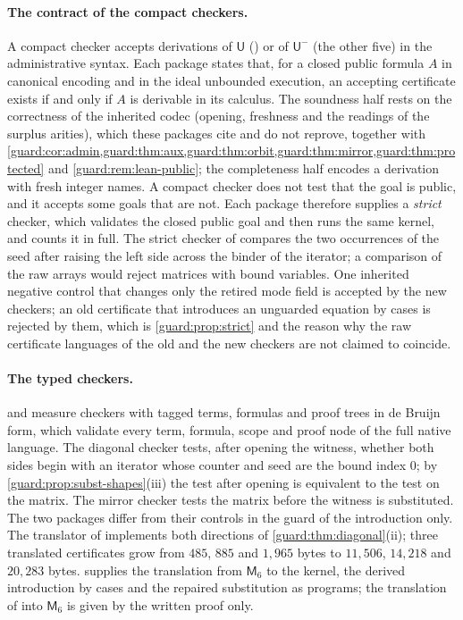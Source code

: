 \paragraph{The contract of the compact checkers.}
A compact checker accepts derivations of $\mathsf U$
() or of $\mathsf U^{-}$ (the other five) in the
administrative syntax.  Each package states that, for a closed public
formula $A$ in canonical encoding and in the ideal unbounded execution, an
accepting certificate exists if and only if $A$ is derivable in its
calculus.  The soundness half rests on the correctness of the inherited
codec (opening, freshness and the readings of the surplus arities), which
these packages cite and do not reprove, together with
\cref{guard:cor:admin,guard:thm:aux,guard:thm:orbit,guard:thm:mirror,guard:thm:protected}
and \cref{guard:rem:lean-public}; the completeness half encodes a
derivation with fresh integer names.  A compact checker does not test that
the goal is public, and it accepts some goals that are not.  Each package
therefore supplies a \emph{strict} checker, which validates the closed
public goal and then runs the same kernel, and counts it in full.  The
strict checker of  compares the two occurrences of the
seed after raising the left side across the binder of the iterator; a
comparison of the raw arrays would reject matrices with bound variables.
One inherited negative control that changes only the retired mode field is
accepted by the new checkers; an old certificate that introduces an
unguarded equation by cases is rejected by them, which is
\cref{guard:prop:strict} and the reason why the raw certificate languages
of the old and the new checkers are not claimed to coincide.

\paragraph{The typed checkers.}
 and  measure checkers with tagged
terms, formulas and proof trees in de Bruijn form, which validate every
term, formula, scope and proof node of the full native language.  The
diagonal checker tests, after opening the witness, whether both sides begin
with an iterator whose counter and seed are the bound index $0$; by
\cref{guard:prop:subst-shapes}(iii) the test after opening is equivalent to
the test on the matrix.  The mirror checker tests the matrix before the
witness is substituted.  The two packages differ from their controls in the
guard of the introduction only.  The translator of 
implements both directions of \cref{guard:thm:diagonal}(ii); three
translated certificates grow from $485$, $885$ and $1{,}965$ bytes to
$11{,}506$, $14{,}218$ and $20{,}283$ bytes.   supplies
the translation from $\mathsf M_6$ to the kernel, the derived introduction
by cases and the repaired substitution as programs; the translation of
 into $\mathsf M_6$ is given by the written proof only.

